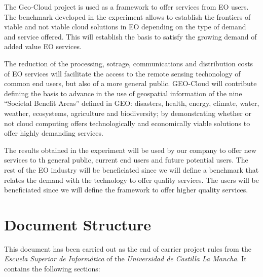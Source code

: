 The Geo-Cloud project is used as a framework to offer services from \ac{EO}
users. The benchmark developed in the experiment allows to establish the
frontiers of viable and not viable cloud solutions in \ac{EO} depending on the
type of demand and service offered. This will establish the basis to satisfy the
growing demand of added value \ac{EO} services.

The reduction of the processing, sotrage, communications and distribution costs
of {EO} services will facilitate the access to the remote sensing techonology of
common end users, but also of a more general public. GEO-Cloud will contribute
defining the basis to advance in the use of geospatial information of the nine
``Societal Benefit Areas'' defined in GEO: disasters, health, energy, climate,
water, weather, ecosystems, agriculture and biodiversity; by demonstrating
whether or not cloud computing offers technologically and economically viable
solutions to offer highly demanding services.

The results obtained in the experiment will be used by our company to offer new
services to th general public, current end users and future potential users. The
rest of the \ac{EO} industry will be beneficiated since we will define a
benchmark that relates the demand with the technology to offer quality
services. The users will be beneficiated since we will define the framework to
offer higher quality services.




\section{Document Structure}

This document has been carried out as the end of carrier project rules from the \emph{Escuela
Superior de Informática} of the \emph{Universidad de Castilla La Mancha}. It contains
the following sections:


